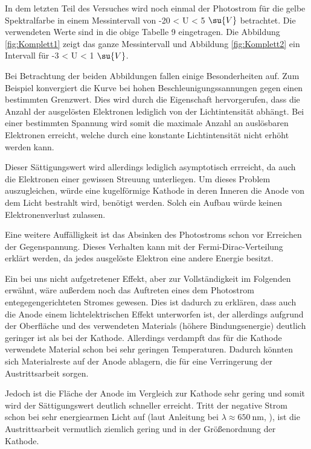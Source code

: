 

In dem letzten Teil des Versuches wird noch einmal der Photostrom für die
gelbe Spektralfarbe in einem Messintervall von -20 < U < 5 $\su{V}$ betrachtet.
Die verwendeten Werte sind in die obige Tabelle 9 eingetragen.
Die Abbildung \ref{fig:Komplett1} zeigt das ganze Messintervall und
Abbildung \ref{fig:Komplett2} ein Intervall für -3 < U < 1 $\su{V}$.

Bei Betrachtung der beiden Abbildungen fallen einige Besonderheiten auf. Zum Beispiel
konvergiert die Kurve bei hohen Beschleunigungssannungen gegen einen bestimmten
Grenzwert. Dies wird durch die Eigenschaft hervorgerufen, dass die Anzahl der ausgelösten Elektronen
lediglich von der Lichtintensität abhängt. Bei einer bestimmten Spannung wird somit
die maximale Anzahl an auslösbaren Elektronen erreicht, welche durch eine konstante
Lichtintensität nicht erhöht werden kann.

Dieser Sättigungswert wird allerdings
lediglich asymptotisch errreicht, da auch die Elektronen einer gewissen Streuung
unterliegen. Um dieses Problem auszugleichen, würde eine kugelförmige
Kathode in deren Inneren die Anode von dem Licht bestrahlt wird, benötigt werden.
Solch ein Aufbau würde keinen Elektronenverlust zulassen.

Eine weitere Auffälligkeit ist das Absinken des Photostroms schon vor Erreichen
der Gegenspannung. Dieses Verhalten kann mit der Fermi-Dirac-Verteilung erklärt
werden, da jedes ausgelöste Elektron eine andere Energie besitzt.

Ein bei uns nicht aufgetretener Effekt, aber zur Vollständigkeit im Folgenden
erwähnt, wäre außerdem noch das Auftreten eines dem
Photostrom entegegengerichteten Stromes gewesen.
Dies ist dadurch zu erklären, dass auch die Anode einem lichtelektrischen
Effekt unterworfen ist, der allerdings aufgrund der Oberfläche und des verwendeten
Materials (höhere Bindungsenergie) deutlich geringer ist als bei der Kathode.
Allerdings verdampft das für die Kathode verwendete Material schon bei sehr
geringen Temperaturen. Dadurch könnten sich Materialreste auf der Anode ablagern,
die für eine Verringerung der Austrittsarbeit sorgen.

Jedoch ist die Fläche der
Anode im Vergleich zur Kathode sehr gering und somit wird der Sättigungswert deutlich
schneller erreicht. Tritt der negative Strom schon bei sehr energiearmen Licht auf
(laut Anleitung bei $\lambda\approx\SI{650}{\nano\meter}$, \cite{anleitung01}), ist
die Austrittsarbeit vermutlich ziemlich gering und in der Größenordnung der Kathode.


